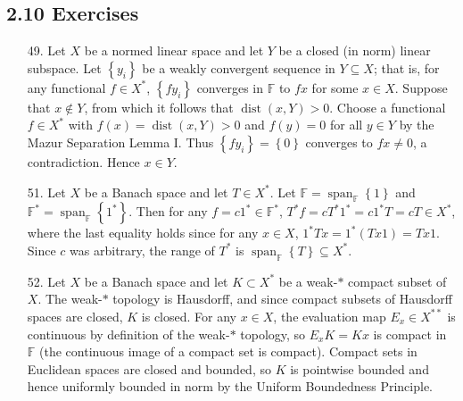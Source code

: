 \documentclass[11pt,leqno]{article}
\theoremstyle{plain}
\theoremstyle{definition}
\numberwithin{equation}{section}
\numberwithin{lem}{section}
\newcommand{\cbr}[1]{\left\{#1\right\}}
\DeclareMathOperator{\Span}{span}
\DeclareMathOperator{\dist}{dist}
\begin{document}
\subsection*{2.10 Exercises}
\begin{enumerate}
    \item[49.] Let $X$ be a normed linear space and let $Y$ be a closed (in norm) linear subspace. Let $\cbr{y_i}$ be a weakly convergent sequence in $Y\subseteq X$; that is, for any functional $f\in X^\ast$, $\cbr{fy_i}$ converges in $\mathbb F$ to $fx$ for some $x\in X$. Suppose that $x\not\in Y$, from which it follows that $\dist(x,Y)>0$. Choose a functional $f\in X^\ast$ with $f(x) = \dist(x,Y)>0$ and $f(y) = 0$ for all $y\in Y$ by the Mazur Separation Lemma I. Thus $\cbr{fy_i} = \cbr{0}$ converges to $fx\neq 0$, a contradiction. Hence $x\in Y$.
    \item[51.] Let $X$ be a Banach space and let $T\in X^\ast$. Let $\mathbb F = \Span_{\mathbb F}\cbr{1}$ and $\mathbb F^\ast = \Span_{\mathbb F}\cbr{1^\ast}$. Then for any $f = c1^\ast\in \mathbb F^\ast$, $T^\ast f = cT^\ast 1^\ast = c1^\ast T = cT\in X^\ast$, where the last equality holds since for any $x\in X$, $1^\ast Tx = 1^\ast(Tx1) = Tx1$. Since $c$ was arbitrary, the range of $T^\ast$ is $\Span_{\mathbb F}\cbr{T}\subseteq X^\ast$.
    \item[52.] Let $X$ be a Banach space and let $K\subset X^\ast$ be a weak-$\ast$ compact subset of $X$. The weak-$\ast$ topology is Hausdorff, and since compact subsets of Hausdorff spaces are closed, $K$ is closed.
    For any $x\in X$, the evaluation map $E_x\in X^{\ast\ast}$ is continuous by definition of the weak-$\ast$ topology, so $E_xK = Kx$ is compact in $\mathbb F$ (the continuous image of a compact set is compact). Compact sets in Euclidean spaces are closed and bounded, so $K$ is pointwise bounded and hence uniformly bounded in norm by the Uniform Boundedness Principle.
\end{enumerate}
\end{document}
